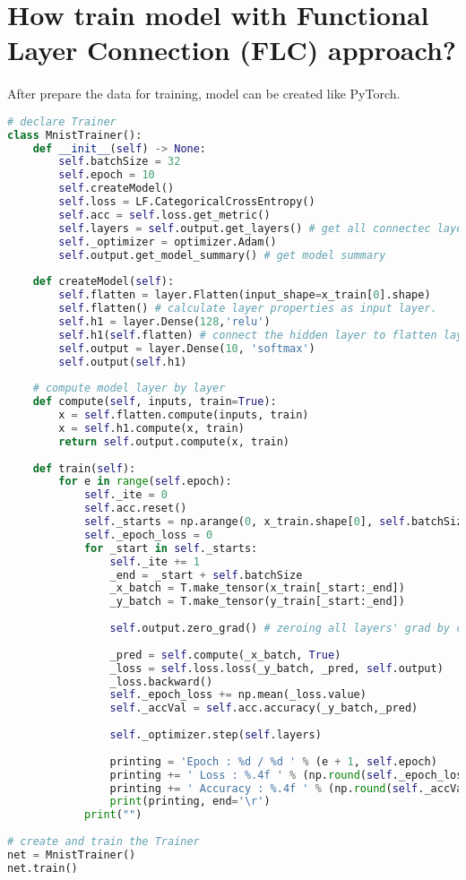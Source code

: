 \documentclass[12pt]{report}
\begin{document}
\section{How train model with Functional Layer Connection (FLC) approach?}
\paragraph{}
After prepare the data for training, model can be created like PyTorch.

\begin{lstlisting}[language=Python, numbers=none, caption={Train and evaluate model with FLC.}, label={ex:train_FLC}]
# declare Trainer
class MnistTrainer():
	def __init__(self) -> None:
		self.batchSize = 32
		self.epoch = 10
		self.createModel()
		self.loss = LF.CategoricalCrossEntropy()
		self.acc = self.loss.get_metric()
		self.layers = self.output.get_layers() # get all connectec layer from input layer.
		self._optimizer = optimizer.Adam()
		self.output.get_model_summary() # get model summary
	
	def createModel(self):
		self.flatten = layer.Flatten(input_shape=x_train[0].shape)
		self.flatten() # calculate layer properties as input layer.
		self.h1 = layer.Dense(128,'relu')
		self.h1(self.flatten) # connect the hidden layer to flatten layer as previous layer.
		self.output = layer.Dense(10, 'softmax')
		self.output(self.h1)
		
	# compute model layer by layer
	def compute(self, inputs, train=True):
		x = self.flatten.compute(inputs, train)
		x = self.h1.compute(x, train)
		return self.output.compute(x, train)
		
	def train(self):
		for e in range(self.epoch):
			self._ite = 0
			self.acc.reset()
			self._starts = np.arange(0, x_train.shape[0], self.batchSize)
			self._epoch_loss = 0
			for _start in self._starts:
				self._ite += 1
				_end = _start + self.batchSize
				_x_batch = T.make_tensor(x_train[_start:_end])
				_y_batch = T.make_tensor(y_train[_start:_end])
				
				self.output.zero_grad() # zeroing all layers' grad by calling `zero_grad`
				
				_pred = self.compute(_x_batch, True)
				_loss = self.loss.loss(_y_batch, _pred, self.output)
				_loss.backward()
				self._epoch_loss += np.mean(_loss.value)           
				self._accVal = self.acc.accuracy(_y_batch,_pred)    
				
				self._optimizer.step(self.layers)
				
				printing = 'Epoch : %d / %d ' % (e + 1, self.epoch)
				printing += ' Loss : %.4f ' % (np.round(self._epoch_loss / self._ite, 4))
				printing += ' Accuracy : %.4f ' % (np.round(self._accVal, 4))
				print(printing, end='\r')
			print("")
			
# create and train the Trainer
net = MnistTrainer()
net.train()
			
\end{lstlisting}
\end{document}
